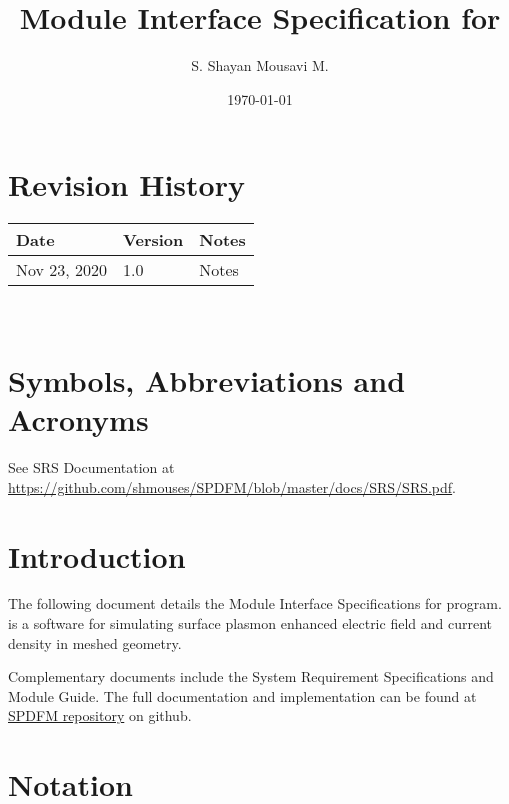 \documentclass[12pt, titlepage]{article}
\begin{document}
\title{Module Interface Specification for \progname{}}

\author{S. Shayan Mousavi M.}

\date{\today}

\maketitle


\section{Revision History}

\begin{tabularx}{\textwidth}{p{3cm}p{2cm}X}
\toprule {\bf Date} & {\bf Version} & {\bf Notes}\\
\midrule
Nov 23, 2020 & 1.0 & Notes\\
\bottomrule
\end{tabularx}

~\newpage

\section{Symbols, Abbreviations and Acronyms}

See SRS Documentation at \url{https://github.com/shmouses/SPDFM/blob/master/docs/SRS/SRS.pdf}.


\newpage

\tableofcontents

\newpage


\section{Introduction}

The following document details the Module Interface Specifications for \progname{} program. \progname{} is a software for simulating surface plasmon enhanced electric field and current density in meshed geometry. 

Complementary documents include the System Requirement Specifications
and Module Guide.  The full documentation and implementation can be
found at \href{https://github.com/shmouses/SPDFM}{SPDFM repository} on github.  

\section{Notation}
\end{document}
